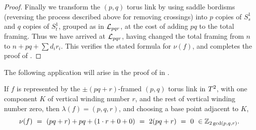 \begin{proof}
Finally we transform the $(p,q)$ torus link by using saddle bordisms (reversing the process described above for removing crossings) into $p$ copies of $S^1_s$ and $q$ copies of $S^1_t$, grouped as in $\mathcal L_{pqr}$, at the cost of adding $pq$ to the total framing.   Thus we have arrived at $\mathcal L_{pqr}$, having changed the total framing from $n$ to $n+pq + \sum d_ir_i.$  This verifies the stated formula for $\nu(f)$, and completes the proof of .
\end{proof}


The following application will arise in the proof of  in .

\begin{example}\label{ex:basecase} 

If $f$ is represented by the $\pm(pq+r)$-framed $(p,q)$ torus link in $T^2$, with one component $K$ of vertical winding number $r$, and the rest of vertical winding number zero, then $\lambda(f)  = (p,q,r)$, and choosing a base point adjacent to $K$,
$$
\nu(f) \ = \ (pq+r) + pq + (1\cdot r + 0 + 0) \ = \ 2(pq+r) \ = \ 0 \ \in \mathbb Z_{2\gcd(p,q,r)}.
$$
\end{example}

 
